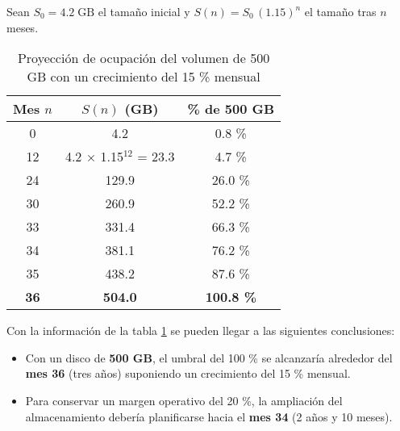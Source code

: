 Sean  
$S_{0}=4.2\;\text{GB}$ el tamaño inicial y  
$S(n)=S_{0}\,(1.15)^{n}$ el tamaño tras $n$ meses.
\newpage
\begin{table}[htbp]
\centering
\caption{Proyección de ocupación del volumen de 500 GB con un crecimiento del 15 \% mensual}
\label{tab:proyeccion500GB}
\begin{tabular}{|c|c|c|}
\hline
\textbf{Mes $n$} & \textbf{$S(n)$ (GB)} & \textbf{\% de 500 GB} \\ \hline
0  & 4.2   & 0.8 \%  \\ \hline
12 & 4.2 $\times$ 1.15$^{12}$ = 23.3 & 4.7 \%  \\ \hline
24 & 129.9 & 26.0 \% \\ \hline
30 & 260.9 & 52.2 \% \\ \hline
33 & 331.4 & 66.3 \% \\ \hline
34 & 381.1 & 76.2 \% \\ \hline
35 & 438.2 & 87.6 \% \\ \hline
\textbf{36} & \textbf{504.0} & \textbf{100.8 \%} \\ \hline
\end{tabular}
\end{table}

Con la información de la tabla \ref{tab:proyeccion500GB} se pueden llegar a las siguientes conclusiones:
\begin{itemize}
  \item Con un disco de \textbf{500 GB}, el umbral del 100 \% se alcanzaría
        alrededor del \textbf{mes 36} (tres años) suponiendo un crecimiento
        del 15 \% mensual.
  \item Para conservar un margen operativo del 20 \%,
        la ampliación del almacenamiento debería planificarse
        hacia el \textbf{mes 34} (2 años y 10 meses).
\end{itemize}
